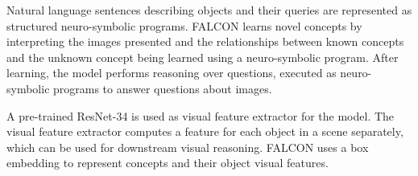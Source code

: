 Natural language sentences describing objects and their queries are represented as structured neuro-symbolic programs.
FALCON learns novel concepts by interpreting the images presented and the relationships between known concepts and the unknown concept being learned using a neuro-symbolic program. 
After learning, the model performs reasoning over questions, executed as neuro-symbolic programs to answer questions about images. 


A pre-trained ResNet-34 is used as visual feature extractor for the model.
The visual feature extractor computes a feature for each object in a scene separately, which can be used for downstream visual reasoning.
FALCON uses a box embedding\citep{vilnis2018probabilistic} to represent concepts and their object visual features.


